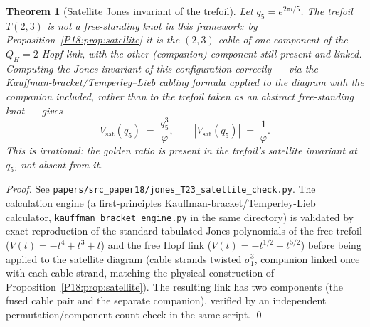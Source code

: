 \documentclass[11pt,a4paper]{article}
\newtheorem{theorem}{Theorem}[section]
\theoremstyle{definition}\newtheorem{definition}[theorem]{Definition}
\theoremstyle{remark}
\newcommand{\vp}{\varphi}
\newcommand{\QH}{Q_H}
\newcommand{\Jones}{V}
\begin{document}
\begin{theorem}[Satellite Jones invariant of the trefoil]
\label{P18:thm:trefoil_satellite_jones}
Let $q_5=e^{2\pi i/5}$.  The trefoil $T(2,3)$ is not a free-standing
knot in this framework: by Proposition~\ref{P18:prop:satellite} it is the
$(2,3)$-cable of one component of the $\QH=2$ Hopf link, with the
other (companion) component still present and linked.  Computing the
Jones invariant of this configuration correctly --- via the
Kauffman-bracket/Temperley--Lieb cabling formula applied to the
diagram with the companion included, rather than to the trefoil taken
as an abstract free-standing knot --- gives
\begin{equation}
  \Jones_{\mathrm{sat}}(q_5) \;=\; \frac{q_5^3}{\vp},
  \qquad
  |\Jones_{\mathrm{sat}}(q_5)| \;=\; \frac{1}{\vp}.
  \label{P18:eq:trefoil_satellite_value}
\end{equation}
This is irrational: the golden ratio is present in the trefoil's
satellite invariant at $q_5$, not absent from it.
\end{theorem}

\begin{proof}
See \texttt{papers/src\_paper18/jones\_T23\_satellite\_check.py}. The
calculation engine (a first-principles Kauffman-bracket/Temperley-Lieb
calculator, \texttt{kauffman\_bracket\_engine.py} in the same
directory) is validated by exact reproduction of the standard
tabulated Jones polynomials of the free trefoil
($V(t)=-t^4+t^3+t$) and the free Hopf link
($V(t)=-t^{1/2}-t^{5/2}$) before being applied to the satellite
diagram (cable strands twisted $\sigma_1^3$, companion linked once
with each cable strand, matching the physical construction of
Proposition~\ref{P18:prop:satellite}).  The resulting link has two
components (the fused cable pair and the separate companion),
verified by an independent permutation/component-count check in the
same script.
\qed
\end{proof}
\end{document}
